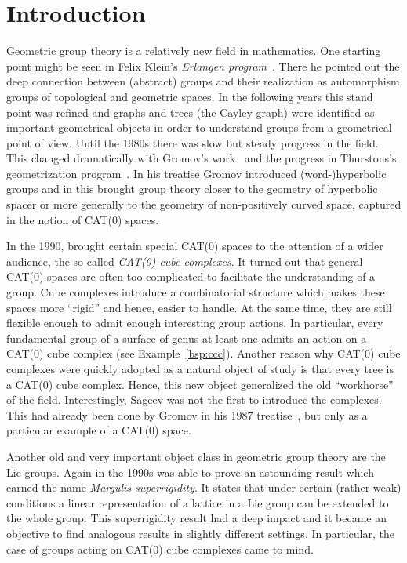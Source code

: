 \section{Introduction}
\label{sec:introduction}

Geometric group theory is a relatively new field in mathematics. One starting point might be seen in Felix Klein's \emph{Erlangen program}~\cite{Klein}. There he pointed out the deep connection between (abstract) groups and their realization as automorphism groups of topological and geometric spaces. In the following years this stand point was refined and graphs and trees (the Cayley graph) were identified as important geometrical objects in order to understand groups from a geometrical point of view. Until the 1980s there was slow but steady progress in the field. This changed dramatically with Gromov's work\ \cite{MR919829} and the progress in Thurstons's geometrization program\ \cite{MR648524}. In his treatise Gromov introduced (word-)hyperbolic groups and in this brought group theory closer to the geometry of hyperbolic spacer or more generally to the geometry of non-positively curved space, captured in the notion of CAT(0) spaces.

In the 1990, \textcite{MR1347406} brought certain special CAT(0) spaces to the attention of a wider audience, the so called \emph{CAT(0) cube complexes}. It turned out that general CAT(0) spaces are often too complicated to facilitate the understanding of a group. Cube complexes introduce a combinatorial structure which makes these spaces more \enquote{rigid} and hence, easier to handle. At the same time, they are still flexible enough to admit enough interesting group actions. In particular, every fundamental group of a surface of genus at least one admits an action on a CAT(0) cube complex (see Example~\ref{bsp:ccc}). Another reason why CAT(0) cube complexes were quickly adopted as a natural object of study is that every tree is a CAT(0) cube complex. Hence, this new object generalized the old \enquote{workhorse} of the field. Interestingly, Sageev was not the first to introduce the complexes. This had already been done by Gromov in his 1987 treatise\ \cite{MR919829}, but only as a particular example of a CAT(0) space.

Another old and very important object class in geometric group theory are the Lie groups. Again in the 1990s \textcite{MR1090825} was able to prove an astounding result which earned the name \emph{Margulis superrigidity}. It states that under certain (rather weak) conditions a linear representation of a lattice in a Lie group can be extended to the whole group. This superrigidity result had a deep impact and it became an objective to find analogous results in slightly different settings. In particular, the case of groups acting on CAT(0) cube complexes came to mind.

